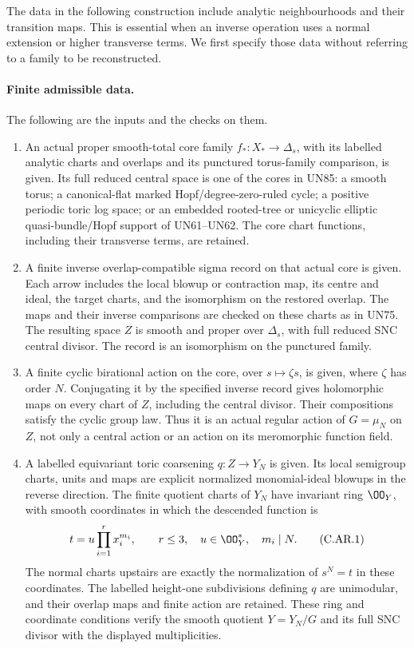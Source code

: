 
The data in the following construction include analytic
neighbourhoods and their transition maps. This is essential
when an inverse operation uses a normal extension or higher
transverse terms. We first specify those data without
referring to a family to be reconstructed.

\paragraph{Finite admissible data.}
The following are the inputs and the checks on them.
\begin{enumerate}
\item An actual proper smooth-total core family
\(f_*:X_*\to\Delta_s\), with its labelled analytic
charts and overlaps and its punctured torus-family
comparison, is given. Its full reduced central space
is one of the cores in UN85: a smooth torus; a
canonical-flat marked Hopf/degree-zero-ruled cycle;
a positive periodic toric log space; or an embedded
rooted-tree or unicyclic elliptic quasi-bundle/Hopf
support of UN61--UN62. The core chart functions,
including their transverse terms, are retained.

\item A finite inverse overlap-compatible sigma record
on that actual core is given. Each arrow includes
the local blowup or contraction map, its centre
and ideal, the target charts, and the isomorphism
on the restored overlap. The maps and their inverse
comparisons are checked on these charts as in UN75.
The resulting space \(Z\) is smooth and proper over
\(\Delta_s\), with full reduced SNC central divisor.
The record is an isomorphism on the punctured family.

\item A finite cyclic birational action on the core,
over \(s\mapsto\zeta s\), is given, where \(\zeta\)
has order \(N\). Conjugating it by the specified
inverse record gives holomorphic maps on every
chart of \(Z\), including the central divisor.
Their compositions satisfy the cyclic group law.
Thus it is an actual regular action of
\(G=\mu_N\) on \(Z\), not only a central action
or an action on its meromorphic function field.

\item A labelled equivariant toric coarsening
\(q:Z\to Y_N\) is given. Its local semigroup
charts, units and maps are explicit normalized
monomial-ideal blowups in the reverse direction.
The finite quotient charts of \(Y_N\) have
invariant ring \(\OO_Y\), with smooth coordinates
in which the descended function is
\[
                  t=u\prod_{i=1}^r x_i^{m_i},
              \qquad r\le3,\quad u\in\OO_Y^*,
              \quad m_i\mid N.
 \tag{C.AR.1}
\]
The normal charts upstairs are exactly the
normalization of \(s^N=t\) in these coordinates.
The labelled height-one subdivisions defining
\(q\) are unimodular, and their overlap maps
and finite action are retained. These ring and
coordinate conditions verify the smooth quotient
\(Y=Y_N/G\) and its full SNC divisor with
the displayed multiplicities.


\end{enumerate}

